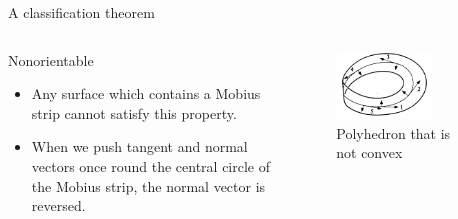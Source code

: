\documentclass{beamer}
\begin{document}
\begin{frame}{A classification theorem}
  \begin{columns}
    \begin{column}{0.6\textwidth}
      \begin{block}{}
        Nonorientable
        \begin{itemize}
        \item Any surface which contains a Mobius strip cannot satisfy this property.
        \item When we push tangent and normal vectors once round the central circle of the Mobius strip, the normal vector is reversed.
        \end{itemize}
      \end{block}
    \end{column}
    \begin{column}{0.4\textwidth}
      \begin{figure}
        \centering
        \includegraphics[width=0.7\textwidth]{figure_1_19_b.png}
        \caption{Polyhedron that is not convex}
      \end{figure}
    \end{column}
  \end{columns}
\end{frame}
\end{document}
